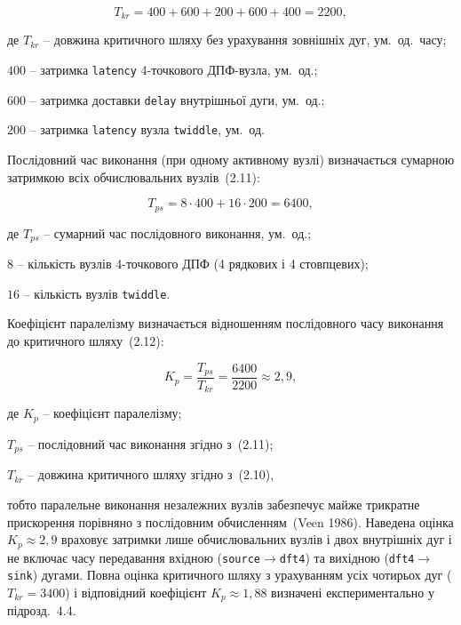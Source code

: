 \documentclass[
]{article}
\begin{document}
\begin{equation}
\tag{2.10}\label{eq:tkr-internal}
T_{kr} = 400 + 600 + 200 + 600 + 400 = 2200,
\end{equation}

де \(T_{kr}\) -- довжина критичного шляху без урахування зовнішніх дуг, ум.~од.~часу;

\(400\) -- затримка \texttt{latency} 4-точкового ДПФ-вузла, ум.~од.;

\(600\) -- затримка доставки \texttt{delay} внутрішньої дуги, ум.~од.;

\(200\) -- затримка \texttt{latency} вузла \texttt{twiddle}, ум.~од.

Послідовний час виконання (при одному активному вузлі) визначається
сумарною затримкою всіх обчислювальних вузлів~(2.11):

\begin{equation}
\tag{2.11}\label{eq:tps}
T_{ps} = 8 \cdot 400 + 16 \cdot 200 = 6400,
\end{equation}

де \(T_{ps}\) -- сумарний час послідовного виконання, ум.~од.;

\(8\) -- кількість вузлів 4-точкового ДПФ (4 рядкових і 4 стовпцевих);

\(16\) -- кількість вузлів \texttt{twiddle}.

Коефіцієнт паралелізму визначається відношенням послідовного часу
виконання до критичного шляху~(2.12):

\begin{equation}
\tag{2.12}\label{eq:kp-internal}
K_{p} = \frac{T_{ps}}{T_{kr}} = \frac{6400}{2200} \approx 2{,}9,
\end{equation}

де \(K_{p}\) -- коефіцієнт паралелізму;

\(T_{ps}\) -- послідовний час виконання згідно з~(2.11);

\(T_{kr}\) -- довжина критичного шляху згідно з~(2.10),

тобто паралельне виконання незалежних вузлів забезпечує майже трикратне
прискорення порівняно з послідовним обчисленням~(Veen 1986). Наведена
оцінка \(K_{p} \approx 2,9\) враховує затримки лише обчислювальних вузлів і
двох внутрішніх дуг і не включає часу передавання вхідною
(\texttt{source}\(\rightarrow\)\texttt{dft4}) та вихідною
(\texttt{dft4}\(\rightarrow\)\texttt{sink}) дугами. Повна оцінка критичного
шляху з урахуванням усіх чотирьох дуг (\(T_{kr} = 3400\)) і відповідний
коефіцієнт \(K_{p} \approx 1,88\) визначені експериментально у
підрозд.~4.4.
\end{document}
